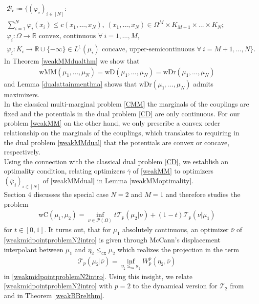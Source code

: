 \documentclass[letterpaper]{amsart}
\newcommand{\RR}{\mathbb{R}}
\theoremstyle{definition}
\begin{document}
\begin{equation}\label{B_cset}
	\begin{gathered}
		\mathcal B_{\bar c}\coloneqq\Big\{(\varphi_i)_{i\in[N]}:\\
		\sum_{i=1}^N\varphi_i(x_i)\leq c(x_1,\dots,x_N),\ (x_1,\dots,x_N)\in\Omega^M\times K_{M+1}\times\dots\times K_N;\\ \varphi_i:\Omega\rightarrow\RR\text{ convex, continuous }\forall\ i=1,\dots,M,\\
		\varphi_i:K_i\rightarrow \RR\cup\{-\infty\}\in L^1(\mu_i)\text{ concave, upper-semicontinuous }\forall\ i=M+1,\dots,N\Big\}.
	\end{gathered}
\end{equation}
In Theorem \ref{weakMMdualthm} we show that
\begin{gather*}
	\text{wMM}(\mu_1,\dots,\mu_N)=\text{wD}(\mu_1,\dots,\mu_N)=\text{wDr}(\mu_1,\dots,\mu_N)
\end{gather*}
and Lemma \ref{dualattainmentlma} shows that $\text{wDr}(\mu_1,\dots,\mu_N)$ admits maximizers.\\
In the classical multi-marginal problem \eqref{CMM} the marginals of the couplings are fixed and the potentials in the dual problem \eqref{CD} are only continuous. For our problem \eqref{weakMM} on the other hand, we only prescribe a convex order relationship on the marginals of the couplings, which translates to requiring in the dual problem \eqref{weakMMdual} that the potentials are convex or concave, respectively.\\
Using the connection with the classical dual problem \eqref{CD}, we establish an optimality condition, relating optimizers $\bar\gamma$ of \eqref{weakMM} to optimizers $(\bar\varphi_i)_{i\in[N]}$ of \eqref{weakMMdual} in Lemma \ref{weakMMoptimality}.\\
Section 4 discusses the special case $N=2$ and $M=1$ and therefore studies the problem
\begin{gather}\label{weakmidpointproblemN2intro}
	\text{wC}(\mu_1,\mu_2)=\inf_{\nu\in\mathcal P(\Omega)}t\mathcal T_p(\mu_2|\nu)+(1-t)\mathcal T_p(\nu|\mu_1)
\end{gather}
for $t\in[0,1]$. It turns out, that for $\mu_1$ absolutely continuous, an optimizer $\bar\nu$ of \eqref{weakmidpointproblemN2intro} is given through McCann's displacement interpolant \cite{mccann1997} between $\mu_1$ and $\bar\eta_2\leq_{\text{cx}}\mu_2$ which realizes the projection in the term
\begin{gather*}
	\mathcal T_p(\mu_2|\bar\nu)=\inf_{\eta_2\leq_{\text{cx}}\mu_2}W_p^p(\eta_2,\bar\nu)
\end{gather*}
in \eqref{weakmidpointproblemN2intro}.
Using this insight, we relate \eqref{weakmidpointproblemN2intro} with $p=2$ to the dynamical version for $\mathcal T_2$ from \cite{gozlan2025} and \cite{guo2026} in Theorem \ref{weakBBrelthm}.
\end{document}
